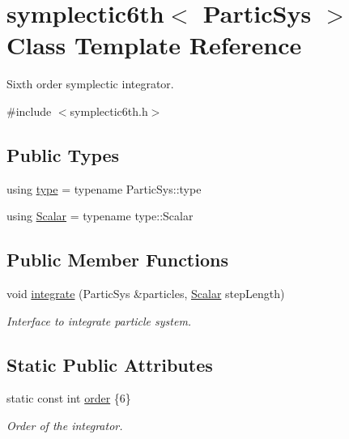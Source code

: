 \hypertarget{classsymplectic6th}{}\section{symplectic6th$<$ Partic\+Sys $>$ Class Template Reference}
\label{classsymplectic6th}


Sixth order symplectic integrator.  




{\ttfamily \#include $<$symplectic6th.\+h$>$}

\subsection*{Public Types}
\begin{DoxyCompactItemize}
\item 
using \mbox{\hyperlink{classsymplectic6th_a8c8736cf1193abff40c406149a32ee78}{type}} = typename Partic\+Sys\+::type
\item 
using \mbox{\hyperlink{classsymplectic6th_a1059d63d55058db7c6ab5b71e097f3ee}{Scalar}} = typename type\+::\+Scalar
\end{DoxyCompactItemize}
\subsection*{Public Member Functions}
\begin{DoxyCompactItemize}
\item 
void \mbox{\hyperlink{classsymplectic6th_ae1e6b8a64e8db932df8e1afb4ff23e0a}{integrate}} (Partic\+Sys \&particles, \mbox{\hyperlink{classsymplectic6th_a1059d63d55058db7c6ab5b71e097f3ee}{Scalar}} step\+Length)
\begin{DoxyCompactList}\small\item\em Interface to integrate particle system. \end{DoxyCompactList}\end{DoxyCompactItemize}
\subsection*{Static Public Attributes}
\begin{DoxyCompactItemize}
\item 
static const int \mbox{\hyperlink{classsymplectic6th_a7f4232a8639d27aeb0890476176e8553}{order}} \{6\}
\begin{DoxyCompactList}\small\item\em Order of the integrator. \end{DoxyCompactList}\end{DoxyCompactItemize}


